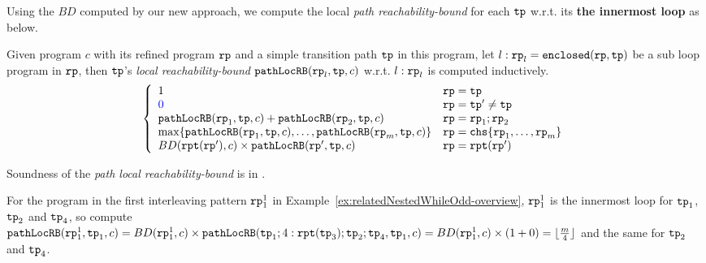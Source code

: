 Using the $BD$ computed by our new approach, we compute the local \emph{path reachability-bound} for
each $\mathtt{tp}$ w.r.t. its \textbf{the innermost loop} as below.

\begin{defn}
    \label{def:pathlocalrb}
    Given program $c$ with its refined program $\mathtt{rp}$ and a simple transition path $\mathtt{tp}$ in this program, 
    let $l: \mathtt{rp}_l = \mathtt{enclosed}(\mathtt{rp}, \mathtt{tp})$ be a sub loop program in $\mathtt{rp}$,
    then $\mathtt{tp}$'s \emph{local reachability-bound} $\mathtt{pathLocRB}(\mathtt{rp}_l, \mathtt{tp}, c)$ w.r.t. $l: \mathtt{rp}_l$
    is computed inductively.
    {\small
    \[
      \left\{
    \begin{array}{ll}
       1  & \rprog = \tpath\\
      \highlight{0} & \rprog = \tpath' \neq \tpath\\
      \outinB(\rprog_1, \tpath, c) + \outinB(\rprog_2, \tpath, c) & \rprog = \rprog_1;\rprog_2 \\
      \max\left\{ \outinB(\rprog_1, \tpath, c), \ldots, \outinB(\rprog_m, \tpath, c) \right\} 
      & \rprog = \rpchoose{\rprog_1, \ldots, \rprog_m } \\
      BD(\rprepeat(\rprog'), c) \times \outinB(\rprog', \tpath, c) & \rprog = \rprepeat(\rprog')
    \end{array}
    \right.
    \]
    }
  \end{defn}
Soundness of the \emph{path local reachability-bound} is in .

  For the program in the first interleaving pattern $\mathtt{rp}_1^1$ in Example~\ref{ex:relatedNestedWhileOdd-overview}, $\mathtt{rp}_1^1$ is the innermost loop for $\mathtt{tp}_1$, $\mathtt{tp}_2$ and $\mathtt{tp}_4$, 
  so compute $\mathtt{pathLocRB}(\mathtt{rp}_1^1, \mathtt{tp}_1, c) = BD(\mathtt{rp}_1^1, c) \times \mathtt{pathLocRB}(\mathtt{tp}_1; 4:\mathtt{rpt}(\mathtt{tp}_3); \mathtt{tp}_2; \mathtt{tp}_4, \mathtt{tp}_1, c)
  = BD(\mathtt{rp}_1^1, c) \times (1 + 0) = \lfloor \frac{m}{4} \rfloor $ and the same for $\mathtt{tp}_2$ and $\mathtt{tp}_4$.

